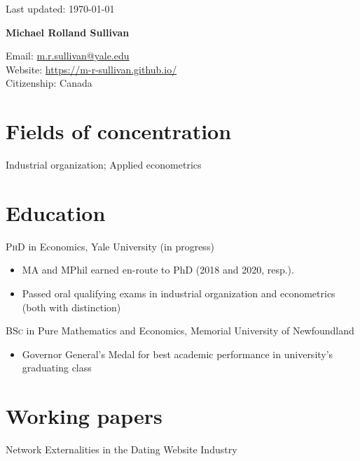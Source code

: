 \documentclass[11pt]{article} %
\begin{document}
 \begin{flushright}
   \scriptsize
	Last updated: \today
   \normalsize
\end{flushright}
{\LARGE\bfseries Michael Rolland Sullivan} %
\bigskip\bigskip\medskip %

\medskip %

Email: \href{mailto:m.r.sullivan@yale.edu}{m.r.sullivan@yale.edu}\\ 
Website: \href{https://m-r-sullivan.github.io/}{https://m-r-sullivan.github.io/}\\ 

Citizenship: Canada 

\section*{Fields of concentration}

Industrial organization; Applied econometrics 

\section*{Education}

\textsc{PhD} in Economics, Yale University (in progress)
\begin{itemize}
	\item MA and MPhil earned en-route to PhD (2018 and 2020, resp.).
	\item Passed oral qualifying exams in industrial organization and econometrics (both with distinction)
\end{itemize}

\textsc{BSc} in Pure Mathematics and Economics, Memorial University of Newfoundland
\begin{itemize}
	\item Governor General's Medal for best academic performance in university's graduating class
\end{itemize}

\section*{Working papers}

Network Externalities in the Dating Website Industry
\end{document}
